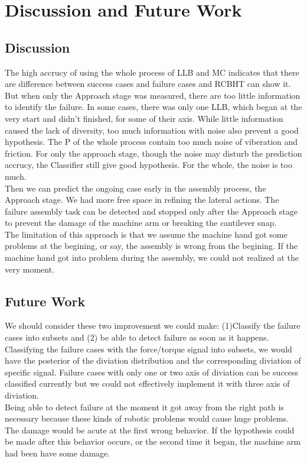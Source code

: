\chapter{Discussion and Future Work}

\section{Discussion}

The high accrucy of using the whole process of LLB and MC indicates that there are difference between success cases and failure cases and RCBHT can show it. But when only the Approach stage was measured, there are too little information to identify the failure. In some cases, there was only one LLB, which began at the very start and didn't finished, for some of their axis. While little information caused the lack of diversity, too much information with noise also prevent a good hypothesis. The P of the whole process contain too much noise of viberation and friction. For only the approach stage, though the noise may disturb the prediction accrucy, the Classifier still give good hypothesis. For the whole, the noise is too much. \\

\indent Then we can predict the ongoing case early in the assembly process, the Approach stage. We had more free space in refining the lateral actions. The failure assembly task can be detected and stopped only after the Approach stage to prevent the damage of the machine arm or breaking the cantilever snap. \\ 

\indent The limitation of this approach is that we assume the machine hand got some problems at the begining, or say, the assembly is wrong from the begining. If the machine hand got into problem during the assembly, we could not realized at the very moment.



\section{Future Work}

We should consider these two improvement we could make: (1)Classify the failure cases into subsets and (2) be able to detect failure as soon as it happens. \\ 

\indent Classifying the failure cases with the force/torque signal into subsets, we would have the posterior of the diviation distribution and the corresponding diviation of specific signal. Failure cases with only one or two axis of diviation can be success classified currently but we could not effectively implement it with three axis of diviation. \\

\indent Being able to detect failure at the moment it got away from the right path is necessary because these kinds of robotic problems would cause huge problems. The damage would be acute at the first wrong behavior. If the hypothesis could be made after this behavior occurs, or the second time it began, the machine arm had been have some damage.   

